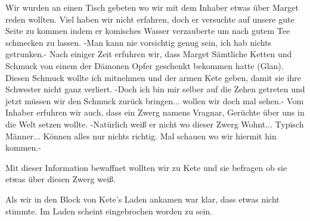 \documentclass[10pt,twoside,twocolumn,openany]{book}
\begin{document}
	Wir wurden an einen Tisch gebeten wo wir mit dem Inhaber etwas über Marget reden wollten. Viel haben wir nicht erfahren, doch er versuchte auf unsere gute Seite zu kommen indem er komisches Wasser verzauberte um nach gutem Tee schmecken zu lassen. -Man kann nie vorsichtig genug sein, ich hab nichts getrunken.- Nach einiger Zeit erfuhren wir, dass Marget Sämtliche Ketten und Schmuck von einem der Dämonen Opfer geschenkt bekommen hatte (Glan). Diesen Schmuck wollte ich mitnehmen und der armen Kete geben, damit sie ihre Schwester nicht ganz verliert. -Doch ich bin mir selber auf die Zehen getreten und jetzt müssen wir den Schmuck zurück bringen... wollen wir doch mal sehen.- Vom Inhaber erfuhren wir auch, dass ein Zwerg namens Vragnar, Gerüchte über uns in die Welt setzen wollte. -Natürlich weiß er nicht wo dieser Zwerg Wohnt... Typisch Männer... Können alles nur nichts richtig. Mal schauen wo wir hiermit hin kommen.- 
	
	Mit dieser Information bewaffnet wollten wir zu Kete und sie befragen ob sie etwas über diesen Zwerg weiß. 
	
	Als wir in den Block von Kete's Laden ankamen war klar, dass etwas nicht stimmte. Im Laden scheint eingebrochen worden zu sein. 
	
\end{document}
